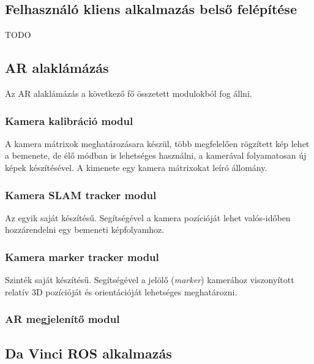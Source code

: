 \documentclass[12pt,a4paper,oneside]{report} %
\begin{document}
\subsection{Felhasználó kliens alkalmazás belső felépítése}
TODO
\subsection{AR alaklámázás}
Az AR alaklámázás a következő fő összetett modulokból fog állni.
\subsubsection{Kamera kalibráció modul} 
A kamera mátrixok meghatározásara készül, több megfelelően rögzített kép lehet a bemenete, de élő módban is lehetséges használni, a kamerával folyamatosan új képek készítésével. A kimenete egy kamera mátrixokat leíró állomány.
\subsubsection{Kamera SLAM tracker modul}
Az egyik saját készítésű. Segítségével a kamera pozícióját lehet valós-időben hozzárendelni egy bemeneti képfolyamhoz.
\subsubsection{Kamera marker tracker modul}
Szinték saját készítésű. Segítségével a jelölő (\textit{marker}) kamerához viszonyított relatív 3D pozícióját és orientációját lehetséges meghatározni.
\subsubsection{AR megjelenítő modul}

\subsection{Da Vinci ROS alkalmazás}
\end{document}
